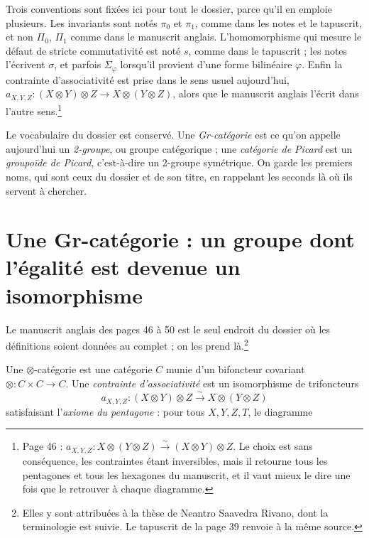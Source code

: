 \documentclass[11pt,a4paper]{article}
\begin{document}
Trois conventions sont fixées ici pour tout le dossier, parce qu'il en emploie
plusieurs. Les invariants sont notés $\pi_{0}$ et $\pi_{1}$, comme dans les
notes et le tapuscrit, et non $\Pi_{0}$, $\Pi_{1}$ comme dans le manuscrit
anglais. L'homomorphisme qui mesure le défaut de stricte commutativité est
noté $s$, comme dans le tapuscrit ; les notes l'écrivent $\sigma$, et parfois
$\Sigma_{\varphi}$ lorsqu'il provient d'une forme bilinéaire $\varphi$. Enfin
la contrainte d'associativité est prise dans le sens usuel aujourd'hui,
$a_{X,Y,Z} : (X \otimes Y) \otimes Z \to X \otimes (Y \otimes Z)$, alors que
le manuscrit anglais l'écrit dans l'autre sens.\footnote{Page 46 :
$a_{X,Y,Z} : X \otimes (Y \otimes Z) \xrightarrow{\ \sim\ } (X \otimes Y)
\otimes Z$. Le choix est sans conséquence, les contraintes étant inversibles,
mais il retourne tous les pentagones et tous les hexagones du manuscrit, et il
vaut mieux le dire une fois que le retrouver à chaque diagramme.}

Le vocabulaire du dossier est conservé. Une \emph{Gr-catégorie} est ce qu'on
appelle aujourd'hui un \emph{2-groupe}, ou groupe catégorique ; une
\emph{catégorie de Picard} est un \emph{groupoïde de Picard}, c'est-à-dire un
2-groupe symétrique. On garde les premiers noms, qui sont ceux du dossier et
de son titre, en rappelant les seconds là où ils servent à chercher.

\section*{Une Gr-catégorie : un groupe dont l'égalité est devenue un
isomorphisme}

Le manuscrit anglais des pages 46 à 50 est le seul endroit du dossier où les
définitions soient données au complet ; on les prend là.\footnote{Elles y sont
attribuées à la thèse de Neantro Saavedra Rivano, dont la terminologie est
suivie. Le tapuscrit de la page 39 renvoie à la même source.}

Une $\otimes$-catégorie est une catégorie $C$ munie d'un bifoncteur covariant
$\otimes : C \times C \to C$. Une \emph{contrainte d'associativité} est un
isomorphisme de trifoncteurs
\[
a_{X,Y,Z} : (X \otimes Y) \otimes Z \xrightarrow{\ \sim\ }
X \otimes (Y \otimes Z)
\]
satisfaisant l'\emph{axiome du pentagone} : pour tous $X, Y, Z, T$, le
diagramme

\end{document}
